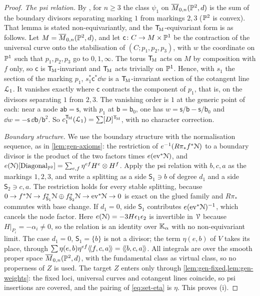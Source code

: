 \begin{proof}
\emph{The psi relation.} By \cite[Lemma 1]{Pan98}, for $n\geq3$ the class $\psi_1$ on $\overline{M}_{0,n}(\mathbb{P}^2,d)$ is the sum of the boundary divisors separating marking $1$ from markings $2,3$ ($\mathbb{P}^2$ is convex). That lemma is stated non-equivariantly, and the $\mathsf{T}_{\!\mathrm{M}}$-equivariant form is as follows. Let $M=\overline{M}_{0,n}(\mathbb{P}^2,d)$, and let $\mathsf{c}\colon C\to M\times\mathbb{P}^1$ be the contraction of the universal curve onto the stabilisation of $(C;p_1,p_2,p_3)$, with $w$ the coordinate on $\mathbb{P}^1$ such that $p_1,p_2,p_3$ go to $0,1,\infty$. The torus $\mathsf{T}_{\!\mathrm{M}}$ acts on $M$ by composition with $f$ only, so $\mathsf{c}$ is $\mathsf{T}_{\!\mathrm{M}}$-invariant and $\mathsf{T}_{\!\mathrm{M}}$ acts trivially on $\mathbb{P}^1$. Hence, with $s_1$ the section of the marking $p_1$, $s_1^*\mathsf{c}^*\dd w$ is a $\mathsf{T}_{\!\mathrm{M}}$-invariant section of the cotangent line $\mathcal{L}_1$. It vanishes exactly where $\mathsf{c}$ contracts the component of $p_1$, that is, on the divisors separating $1$ from $2,3$. The vanishing order is $1$ at the generic point of each: near a node $\mathsf{a}\mathsf{b}=\mathsf{s}$, with $p_1$ at $\mathsf{b}=\mathsf{b}_0$, one has $w=\mathsf{s}/\mathsf{b}-\mathsf{s}/\mathsf{b}_0$ and $\dd w=-\mathsf{s}\,\dd\mathsf{b}/\mathsf{b}^2$. So $c_1^{\mathsf{T}_{\!\mathrm{M}}}(\mathcal{L}_1)=\sum[D]^{\mathsf{T}_{\!\mathrm{M}}}$, with no character correction.

\emph{Boundary structure.} We use the boundary structure with the normalisation sequence, as in \cref{lem:gen-axioms}: the restriction of $e^{-1}(R\pi_*f^*\mathcal{N})$ to a boundary divisor is the product of the two factors times $e(\mathrm{ev}^*\mathcal{N})$, and $e(\mathcal{N})[\mathrm{Diagonal}_{\mathbb{P}^2}]=\sum_{e,f}\eta^{ef}H^e\otimes H^f$. Apply the psi relation with $b,c,a$ as the markings $1,2,3$, and write a splitting as a side $\mathsf{S}_1\ni b$ of degree $d_1$ and a side $\mathsf{S}_2\ni c,a$. The restriction holds for every stable splitting, because $0\to f^*\mathcal{N}\to f_{\mathsf{S}_1}^*\mathcal{N}\oplus f_{\mathsf{S}_2}^*\mathcal{N}\to\mathrm{ev}^*\mathcal{N}\to0$ is exact on the glued family and $R\pi_*$ commutes with base change. If $d_1=0$, side $\mathsf{S}_1$ contributes $e(\mathrm{ev}^*\mathcal{N})^{-1}$, which cancels the node factor. Here $e(\mathcal{N})=-3H\epsilon_1\epsilon_2$ is invertible in $\mathcal{V}$ because $H|_{P_i}=-\alpha_i\neq0$, so the relation is an identity over $\mathbb{K}_{\alpha}$ with no non-equivariant limit. The case $d_1=0$, $\mathsf{S}_1=\{b\}$ is not a divisor; the term $\eta(e,b)$ of $V$ takes its place, through $\sum\eta(e,b)\eta^{ef}\langle\!\langle f,c,a \rangle\!\rangle=\langle\!\langle b,c,a \rangle\!\rangle$. All integrals are over the smooth proper space $\overline{M}_{0,n}(\mathbb{P}^2,d)$, with the fundamental class as virtual class, so no properness of $Z$ is used. The target $Z$ enters only through \cref{lem:gen-fixed,lem:gen-weights}: the fixed loci, universal curves and cotangent lines coincide, so psi insertions are covered, and the pairing of \cref{eq:set-eta} is $\eta$. This proves (i).


\end{proof}
